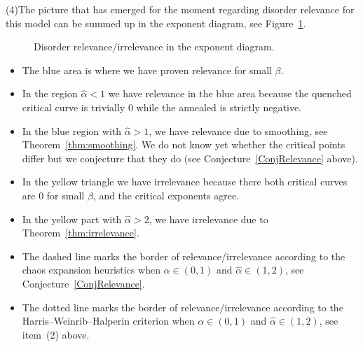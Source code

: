 \documentclass[11pt]{article}
\theoremstyle{definition}
\numberwithin{equation}{section}
\numberwithin{figure}{section}
\numberwithin{table}{section}
\newcommand{\ga}{\alpha}
\newcommand{\gb}{\beta}
\newcommand{\ha}{\hat\ga}
\begin{document}
\medskip
\noindent (4)\enskip The picture that has emerged for the moment regarding disorder relevance for this model can be summed up in the exponent diagram, see Figure~\ref{fig.sum}.
\begin{figure}
\begin{center}
\end{center}
\caption{\label{fig.sum}
Disorder relevance/irrelevance in the exponent diagram. }
\end{figure}
\begin{itemize}
\item The blue area is where we have proven relevance for small $\gb$.
\item In the region $\ha < 1$ we have relevance in the blue area because the quenched critical curve is trivially 0 while the annealed is strictly negative.
\item In the blue region with $\ha > 1$, we have relevance due to smoothing, see Theorem~\ref{thm:smoothing}. We do not know yet whether the critical points differ but we conjecture that they do (see Conjecture~\ref{ConjRelevance} above).
\item In the yellow triangle we have irrelevance because there both critical curves are 0 for small $\gb$, and the critical exponents agree.
\item In the yellow part with $\ha > 2$, we have irrelevance due to Theorem~\ref{thm:irrelevance}.
\item The dashed line marks the border of relevance/irrelevance according to the chaos expansion heuristics when $\ga\in(0,1)$ and $\ha\in(1,2)$, see Conjecture~\ref{ConjRelevance}.
\item The dotted line marks the border of relevance/irrelevance according to the Harris--Weinrib--Halperin criterion when $\ga\in(0,1)$ and $\ha\in(1,2)$, see item~(2) above.
\end{itemize}
\end{document}
